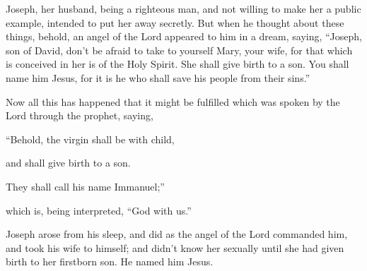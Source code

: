 {Joseph, her husband, being a righteous man, and not willing to make her a public example, intended to put her away secretly.
But when he thought about these things, behold, an angel of the Lord appeared to him in a dream, saying, “Joseph, son of David, don’t be afraid to take to yourself Mary, your wife, for that which is conceived in her is of the Holy Spirit.
She shall give birth to a son. You shall name him Jesus, for it is he who shall save his people from their sins.”
\par }{\PP {}Now all this has happened that it might be fulfilled which was spoken by the Lord through the prophet, saying,
\par }{\Q {}“Behold, the virgin shall be with child,
\par }{\QB and shall give birth to a son.
\par }{\Q They shall call his name Immanuel;”
\par }{\QB which is, being interpreted, “God with us.”
\par }{\PP {}Joseph arose from his sleep, and did as the angel of the Lord commanded him, and took his wife to himself;
and didn’t know her sexually until she had given birth to her firstborn son. He named him Jesus.

}
